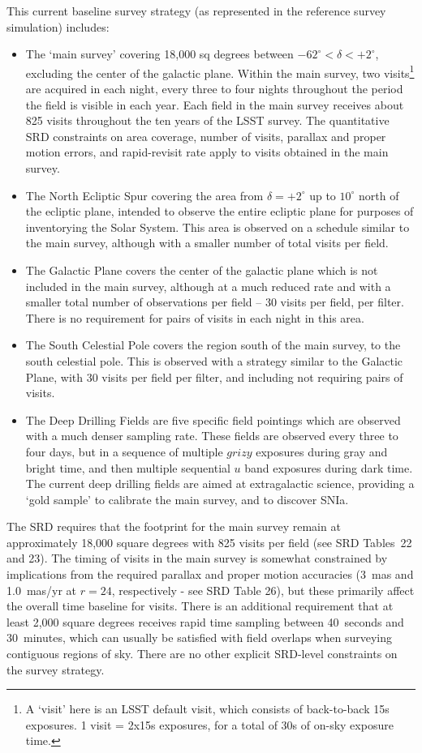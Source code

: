 \documentclass[DM,lsstdraft,toc,usenatbib]{lsstdoc}
\begin{document}
This current baseline survey strategy (as represented in the reference survey simulation) includes:
\begin{itemize}
\item The `main survey' covering 18,000 sq degrees between $-62^\circ < \delta < +2^\circ$, excluding the 
center of the galactic plane. Within the main survey, two visits\footnote{A `visit' here is an LSST default visit, which 
consists of back-to-back 15s exposures. 1 visit = 2x15s exposures, for a total of 30s of on-sky exposure time.} 
are acquired in each night, every three to four nights throughout the period the field is visible in each year. Each
field in the main survey receives about 825 visits throughout the ten years of the LSST survey. The quantitative SRD 
constraints on area coverage, number of visits, parallax and proper motion errors, and rapid-revisit rate apply to 
visits obtained in the main survey.
\item The North Ecliptic Spur covering the area from $\delta = +2^\circ$ up to $10^\circ$ north of the ecliptic plane, 
intended to observe the entire ecliptic plane for purposes of inventorying the Solar System. This area is observed on
a schedule similar to the main survey, although with a smaller number of total visits per field.
\item The Galactic Plane covers the center of the galactic plane which is not included in the main survey, although at a 
much reduced rate and with a smaller total number of observations per field -- 30 visits per field, per filter. There is no requirement
for pairs of visits in each night in this area.
\item The South Celestial Pole covers the region south of the main survey, to the south celestial pole. This is observed with
a strategy similar to the Galactic Plane, with 30 visits per field per filter, and including not requiring pairs of visits. 
\item The Deep Drilling Fields are five specific field pointings which are observed with a much denser sampling rate. These fields
are observed every three to four days, but in a sequence of multiple $grizy$ exposures during gray and bright time, and then
multiple sequential $u$ band exposures during dark time. The current deep drilling fields are aimed at extragalactic
science, providing a `gold sample' to calibrate the main survey, and to discover SNIa. 
\end{itemize}
The SRD requires that the footprint for the main survey remain at approximately 18,000 square degrees with 825 visits per 
field (see SRD Tables~22 and 23). The timing of visits in the main survey is somewhat constrained by implications from the required 
parallax and proper motion accuracies (3~mas and 1.0~mas/yr at $r=24$, respectively - see SRD Table 26), but these primarily 
affect the overall time baseline for visits.  There is an additional requirement that at least 2,000 square degrees receives rapid time 
sampling between 40~seconds and 30~minutes, which can usually be satisfied with field overlaps when surveying contiguous regions
of sky. There are no other explicit SRD-level constraints on the survey strategy. 
\end{document}
